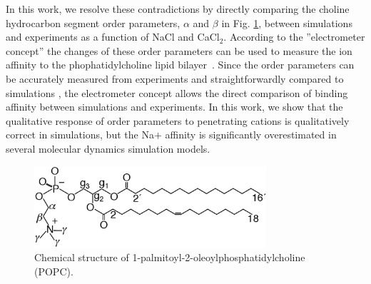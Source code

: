 \documentclass[pre,aps,floatfix,authordate1-4,twocolumn]{revtex4-1}
\begin{document}
In this work, we resolve these contradictions by directly comparing the choline hydrocarbon 
segment order parameters, $\alpha$ and $\beta$ in Fig. \ref{POPCstructure}, 
between simulations and experiments as a function of NaCl and CaCl$_2$. 
According to the ''electrometer concept'' the changes of these order parameters can be 
used to measure the ion affinity to the phophatidylcholine lipid bilayer~\cite{akutsu81,altenbach84,seelig87,scherer89}.
Since the order parameters can be accurately measured from experiments and straightforwardly compared to 
simulations \cite{ollila15}, the electrometer concept allows the direct comparison of binding affinity between simulations
and experiments. In this work, we show that the qualitative response of order parameters
to penetrating cations is qualitatively correct in simulations, but the Na$ {+}$ affinity is significantly
overestimated in several molecular dynamics simulation models. 

\begin{figure}[]
  \centering
  \includegraphics[width=8.6cm]{../Fig/POPCstructure.eps}

  \caption{\label{POPCstructure}
    Chemical structure of 1-palmitoyl-2-oleoylphosphatidylcholine (POPC).}
  
\end{figure}
\end{document}
